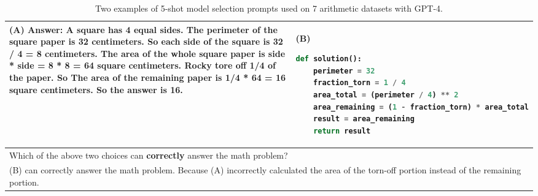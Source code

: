 \documentclass[11pt]{article}
\begin{document}
\begin{table*}[ht]
\begin{tabular}{p{}|p{}}
    \small \textbf{(A)} \newline
    \newline
    \small Answer: \newline
     \small A square has 4 equal sides. \newline
     \small The perimeter of the square paper is 32 centimeters. \newline
     \small So each side of the square is 32 / 4 = 8 centimeters. \newline
     \small The area of the whole square paper is side * side = 8 * 8 = 64 square centimeters. \newline
     \small Rocky tore off 1/4 of the paper. \newline
     \small So The area of the remaining paper is 1/4 * 64 = 16 square centimeters. \newline
     \small So the answer is 16. \newline

     &
    \small \textbf{(B)} 
    \lstset{style=mystyle}
     \begin{lstlisting}[language=Python]
def solution():
    perimeter = 32
    fraction_torn = 1 / 4
    area_total = (perimeter / 4) ** 2
    area_remaining = (1 - fraction_torn) * area_total
    result = area_remaining
    return result
     \end{lstlisting} \\
     \midrule
     \multicolumn{2}{p{0.92\textwidth}}{\small Which of the above two choices can \textbf{correctly} answer the math problem? }\\
\multicolumn{2}{p{0.92\textwidth}}{\small (B) can correctly answer the math problem. Because (A) incorrectly calculated the area of the torn-off portion instead of the remaining portion.}\\
     \bottomrule
    \end{tabular}
    \caption{Two examples of 5-shot model selection prompts used on 7 arithmetic datasets with GPT-4.}

    \label{tab:gpt4_example_math}
\end{table*}
\end{document}
